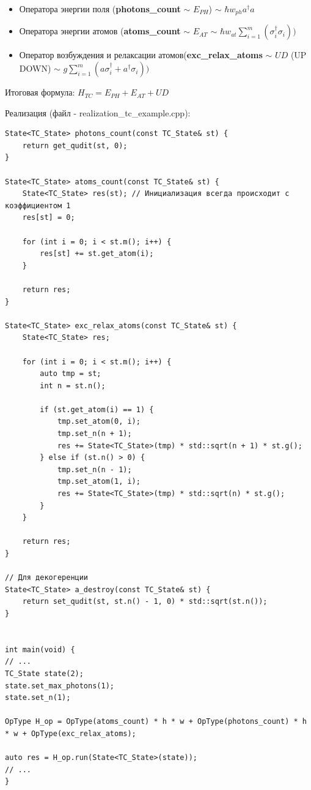 \documentclass[12pt,fleqn]{article}
\begin{document}
        \begin{itemize}
            \item{Оператора энергии поля (\textbf{photons\_count} $\sim$ $E_{PH}$) $\sim$ $\hbar{w_{ph}}{a^{\dagger}}{a}$}
            \item{Оператора энергии атомов (\textbf{atoms\_count} $\sim$ $E_{AT}$ $\sim$ ${\hbar}{w_{at}}{\sum\limits_{i = 1}^{m}(\sigma^{\dagger}_{i}\sigma_{i})})$}
            \item{Оператор возбуждения и релаксации атомов(\textbf{exc\_relax\_atoms} $\sim$ $UD$ (UP DOWN) $\sim$ ${g}\sum\limits_{i=1}^{m}({a}\sigma^{\dagger}_{i} + a^{\dagger}\sigma_{i}))$}
        \end{itemize}

        Итоговая формула:
        $H_{TC} = E_{PH} + E_{AT} + UD$

        Реализация (файл - \textsf{realization\_tc\_example.cpp}):

\begin{mdframed}[linecolor=black, topline=true, bottomline=true,
leftline=false, rightline=false]
\begin{verbatim}
State<TC_State> photons_count(const TC_State& st) {
    return get_qudit(st, 0);
}

State<TC_State> atoms_count(const TC_State& st) {
    State<TC_State> res(st); // Инициализация всегда происходит с коэффициентом 1
    res[st] = 0;

    for (int i = 0; i < st.m(); i++) {
        res[st] += st.get_atom(i);
    }

    return res;
}

State<TC_State> exc_relax_atoms(const TC_State& st) {
    State<TC_State> res;

    for (int i = 0; i < st.m(); i++) {
        auto tmp = st;
        int n = st.n();

        if (st.get_atom(i) == 1) {
            tmp.set_atom(0, i);
            tmp.set_n(n + 1);
            res += State<TC_State>(tmp) * std::sqrt(n + 1) * st.g(); 
        } else if (st.n() > 0) {
            tmp.set_n(n - 1);
            tmp.set_atom(1, i);
            res += State<TC_State>(tmp) * std::sqrt(n) * st.g(); 
        }
    }

    return res;
}

// Для декогеренции
State<TC_State> a_destroy(const TC_State& st) {
    return set_qudit(st, st.n() - 1, 0) * std::sqrt(st.n());
}


int main(void) {
// ...
TC_State state(2);
state.set_max_photons(1);
state.set_n(1);

OpType H_op = OpType(atoms_count) * h * w + OpType(photons_count) * h * w + OpType(exc_relax_atoms);

auto res = H_op.run(State<TC_State>(state));
// ...
}
\end{verbatim}
\end{mdframed}
\end{document}
